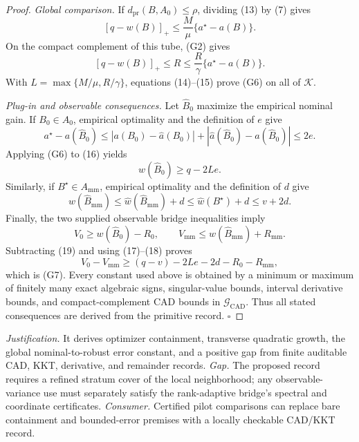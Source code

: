\documentclass{article}
\begin{document}
\begin{proof}
\emph{Global comparison.}
If \(d_{\mathrm{pr}}(B,A_0)\le\rho\), dividing (13) by (7) gives
\[
[q-w(B)]_+\le\frac M\mu\{a^\star-a(B)\}.
\tag{14}
\]
On the compact complement of this tube, (G2) gives
\[
[q-w(B)]_+\le R
\le\frac R\gamma\{a^\star-a(B)\}.
\tag{15}
\]
With \(L=\max\{M/\mu,R/\gamma\}\), equations (14)--(15) prove (G6) on all of \(\mathcal K\).

\emph{Plug-in and observable consequences.}
Let \(\widehat B_0\) maximize the empirical nominal gain.  If \(B_0\in A_0\), empirical optimality and the definition of \(e\) give
\[
a^\star-a(\widehat B_0)
\le |a(B_0)-\widehat a(B_0)|
+|\widehat a(\widehat B_0)-a(\widehat B_0)|
\le2e.
\tag{16}
\]
Applying (G6) to (16) yields
\[
w(\widehat B_0)\ge q-2Le.
\tag{17}
\]
Similarly, if \(B^\star\in A_{\mathrm{mm}}\), empirical optimality and the definition of \(d\) give
\[
w(\widehat B_{\mathrm{mm}})
\le\widehat w(\widehat B_{\mathrm{mm}})+d
\le\widehat w(B^\star)+d
\le v+2d.
\tag{18}
\]
Finally, the two supplied observable bridge inequalities imply
\[
V_0\ge w(\widehat B_0)-R_0,
\qquad
V_{\mathrm{mm}}\le w(\widehat B_{\mathrm{mm}})+R_{\mathrm{mm}}.
\tag{19}
\]
Subtracting (19) and using (17)--(18) proves
\[
V_0-V_{\mathrm{mm}}
\ge(q-v)-2Le-2d-R_0-R_{\mathrm{mm}},
\]
which is (G7).  Every constant used above is obtained by a minimum or maximum of finitely many exact algebraic signs, singular-value bounds, interval derivative bounds, and compact-complement CAD bounds in \(\mathscr G_{\mathrm{CAD}}\).  Thus all stated consequences are derived from the primitive record. \(\square\)
\end{proof}
\par\smallskip\noindent \textit{Justification.} It derives optimizer containment, transverse quadratic growth, the global nominal-to-robust error constant, and a positive gap from finite auditable CAD, KKT, derivative, and remainder records. \textit{Gap.} The proposed record requires a refined stratum cover of the local neighborhood; any observable-variance use must separately satisfy the rank-adaptive bridge's spectral and coordinate certificates. \textit{Consumer.} Certified pilot comparisons can replace bare containment and bounded-error premises with a locally checkable CAD/KKT record.
\end{document}
